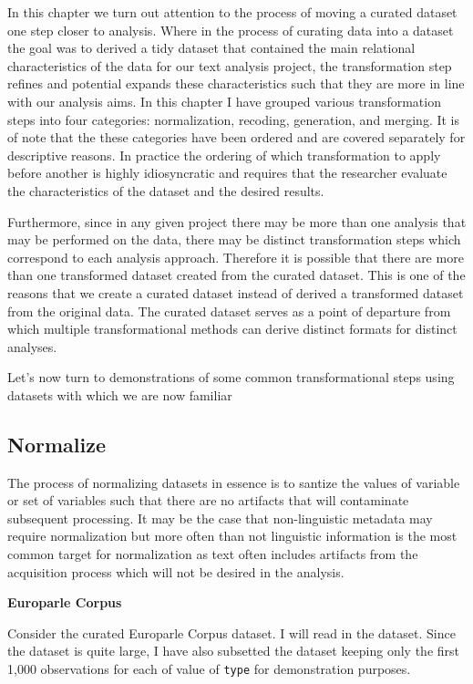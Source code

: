 \documentclass[
]{article}
\begin{document}
In this chapter we turn out attention to the process of moving a curated dataset one step closer to analysis. Where in the process of curating data into a dataset the goal was to derived a tidy dataset that contained the main relational characteristics of the data for our text analysis project, the transformation step refines and potential expands these characteristics such that they are more in line with our analysis aims. In this chapter I have grouped various transformation steps into four categories: normalization, recoding, generation, and merging. It is of note that the these categories have been ordered and are covered separately for descriptive reasons. In practice the ordering of which transformation to apply before another is highly idiosyncratic and requires that the researcher evaluate the characteristics of the dataset and the desired results.

Furthermore, since in any given project there may be more than one analysis that may be performed on the data, there may be distinct transformation steps which correspond to each analysis approach. Therefore it is possible that there are more than one transformed dataset created from the curated dataset. This is one of the reasons that we create a curated dataset instead of derived a transformed dataset from the original data. The curated dataset serves as a point of departure from which multiple transformational methods can derive distinct formats for distinct analyses.

Let's now turn to demonstrations of some common transformational steps using datasets with which we are now familiar

\hypertarget{normalize}{%
\subsection{Normalize}\label{normalize}}

The process of normalizing datasets in essence is to santize the values of variable or set of variables such that there are no artifacts that will contaminate subsequent processing. It may be the case that non-linguistic metadata may require normalization but more often than not linguistic information is the most common target for normalization as text often includes artifacts from the acquisition process which will not be desired in the analysis.

\textbf{Europarle Corpus}

Consider the curated Europarle Corpus dataset. I will read in the dataset. Since the dataset is quite large, I have also subsetted the dataset keeping only the first 1,000 observations for each of value of \texttt{type} for demonstration purposes.
\end{document}
